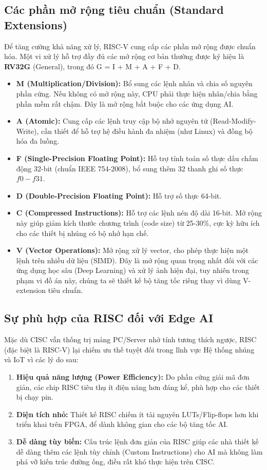 \subsection{Các phần mở rộng tiêu chuẩn (Standard Extensions)}
Để tăng cường khả năng xử lý, RISC-V cung cấp các phần mở rộng được chuẩn hóa. Một vi xử lý hỗ trợ đầy đủ các mở rộng cơ bản thường được ký hiệu là \textbf{RV32G} (General), trong đó G = I + M + A + F + D.

\begin{itemize}
    \item \textbf{M (Multiplication/Division):} Bổ sung các lệnh nhân và chia số nguyên phần cứng. Nếu không có mở rộng này, CPU phải thực hiện nhân/chia bằng phần mềm rất chậm. Đây là mở rộng bắt buộc cho các ứng dụng AI.
    \item \textbf{A (Atomic):} Cung cấp các lệnh truy cập bộ nhớ nguyên tử (Read-Modify-Write), cần thiết để hỗ trợ hệ điều hành đa nhiệm (như Linux) và đồng bộ hóa đa luồng.
    \item \textbf{F (Single-Precision Floating Point):} Hỗ trợ tính toán số thực dấu chấm động 32-bit (chuẩn IEEE 754-2008), bổ sung thêm 32 thanh ghi số thực $f0-f31$.
    \item \textbf{D (Double-Precision Floating Point):} Hỗ trợ số thực 64-bit.
    \item \textbf{C (Compressed Instructions):} Hỗ trợ các lệnh nén độ dài 16-bit. Mở rộng này giúp giảm kích thước chương trình (code size) từ 25-30\%, cực kỳ hữu ích cho các thiết bị nhúng có bộ nhớ hạn chế.
    \item \textbf{V (Vector Operations):} Mở rộng xử lý vector, cho phép thực hiện một lệnh trên nhiều dữ liệu (SIMD). Đây là mở rộng quan trọng nhất đối với các ứng dụng học sâu (Deep Learning) và xử lý ảnh hiện đại, tuy nhiên trong phạm vi đồ án này, chúng ta sẽ thiết kế bộ tăng tốc riêng thay vì dùng V-extension tiêu chuẩn.
\end{itemize}

\subsection{Sự phù hợp của RISC đối với Edge AI}
Mặc dù CISC vẫn thống trị mảng PC/Server nhờ tính tương thích ngược, RISC (đặc biệt là RISC-V) lại chiếm ưu thế tuyệt đối trong lĩnh vực Hệ thống nhúng và IoT vì các lý do sau:
\begin{enumerate}
    \item \textbf{Hiệu quả năng lượng (Power Efficiency):} Do phần cứng giải mã đơn giản, các chip RISC tiêu thụ ít điện năng hơn đáng kể, phù hợp cho các thiết bị chạy pin.
    \item \textbf{Diện tích nhỏ:} Thiết kế RISC chiếm ít tài nguyên LUTs/Flip-flops hơn khi triển khai trên FPGA, để dành không gian cho các bộ tăng tốc AI.
    \item \textbf{Dễ dàng tùy biến:} Cấu trúc lệnh đơn giản của RISC giúp các nhà thiết kế dễ dàng thêm các lệnh tùy chỉnh (Custom Instructions) cho AI mà không làm phá vỡ kiến trúc đường ống, điều rất khó thực hiện trên CISC.
\end{enumerate}

